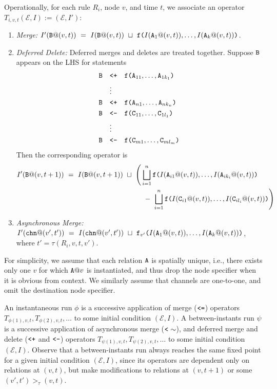 \documentclass{article}
\numberwithin{equation}{section}
\renewcommand{\tt}[1]{\ifmmode\text{\texttt{#1}}\else\texttt{#1}\fi}
\begin{document}
Operationally, for each rule $R_i$, node $v$, and time $t$, we associate an operator $T_{i,v,t}(\mathcal{E}, I) := (\mathcal{E}, I')$:
\begin{enumerate}
\item\emph{Merge:} $I'(\tt{B}@(v,t)) ~=~ I(\tt{B}@(v,t)) ~\sqcup~ \tt{f(}I(\tt{A}_1@(v,t)),\dots,I(\tt{A}_k@(v,t))\tt{)}$.
\item\emph{Deferred Delete:} Deferred merges and deletes are treated together.
Suppose $\tt{B}$ appears on the LHS for statements
\begin{align*}
\tt{B} &\quad\tt{<+}\quad \tt{f(}\tt{A}_{11},\dots,\tt{A}_{1k_1}\tt{)}\\
&\quad\vdots\\
\tt{B} &\quad\tt{<+}\quad \tt{f(}\tt{A}_{n1},\dots,\tt{A}_{nk_n}\tt{)}\\
\tt{B} &\quad\tt{<-}\quad \tt{f(}\tt{C}_{11},\dots,\tt{C}_{1l_1}\tt{)}\\
&\quad\vdots\\
\tt{B} &\quad\tt{<-}\quad \tt{f(}\tt{C}_{m1},\dots,\tt{C}_{ml_m}\tt{)}
\end{align*}
Then the corresponding operator is
\begin{align*}
I'(\tt{B}@(v,t+1)) ~=~ I(\tt{B}@(v,t+1)) ~\sqcup~ \Bigg(
&\bigsqcup_{i=1}^n \tt{f(}I(\tt{A}_{i1}@(v,t)),\dots,I(\tt{A}_{ik_i}@(v,t))\tt{)}\\
&~-~
\bigsqcup_{i=1}^n \tt{f(}I(\tt{C}_{i1}@(v,t)),\dots,I(\tt{C}_{il_i}@(v,t))\tt{)}
\Bigg)
\end{align*}
\item\emph{Asynchronous Merge:} $I'(\tt{chn}@(v',t')) ~=~ I(\tt{chn}@(v',t')) ~\sqcup~ \tt{f}_{v'}\tt{(}I(\tt{A}_1@(v,t)),\dots,I(\tt{A}_k@(v,t))\tt{)}$, where $t' = \tau(R_i, v, t, v')$.
\end{enumerate}
For simplicity, we assume that each relation $\tt{A}$ is spatially unique, i.e., there exists only one $v$ for which $\tt{A}@v$ is instantiated, and thus drop the node specifier when it is obvious from context.
We similarly assume that channels are one-to-one, and omit the destination node specifier.

An instantaneous run $\phi$ is a successive application of merge ($\tt{<=}$) operators $T_{\phi(1),v,t}, T_{\phi(2),v,t}, \dots$ to some initial condition $(\mathcal{E}, I)$.
A between-instants run $\psi$ is a successive application of asynchronous merge ($\tt{<}\sim$), and deferred merge and delete ($\tt{<+}$ and $\tt{<-}$) operators $T_{\psi(1),v,t}, T_{\psi(2),v,t}, \dots$ to some initial condition $(\mathcal{E}, I)$.
Observe that a between-instants run always reaches the same fixed point for a given initial condition $(\mathcal{E}, I)$, since its operators are dependent only on relations at $(v,t)$, but make modifications to relations at $(v,t+1)$ or some $(v',t') >_\tau (v,t)$.
\end{document}

